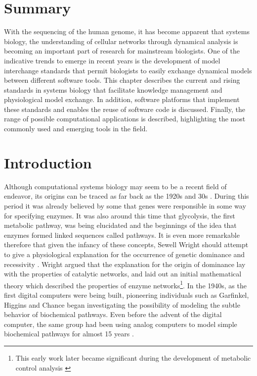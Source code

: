 \section{Summary}

With the sequencing of the human genome, it has become apparent that
systems biology, the understanding of cellular networks through
dynamical analysis is becoming an important part of research for
mainstream biologists. One of the indicative trends to emerge in recent
years is the development of model interchange standards that permit
biologists to easily exchange dynamical models between different
software tools. This chapter describes the current and rising standards
in systems biology that facilitate knowledge management and
physiological model exchange. In addition, software platforms that
implement these standards and enables the reuse of software code is
discussed. Finally, the range of possible computational applications is
described, highlighting the most commonly used and emerging tools in the
field.

\section{Introduction}

Although computational systems biology may seem to be a recent field of
endeavor, its origins can be traced as far back as the 1920s and 30s
\autocite{Wright1929}. During this period it was already believed by
some that genes were responsible in some way for specifying enzymes. It
was also around this time that glycolysis, the first metabolic pathway,
was being elucidated and the beginnings of the idea that enzymes formed
linked sequences called pathways. It is even more remarkable therefore
that given the infancy of these concepts, Sewell Wright should attempt
to give a physiological explanation for the occurrence of genetic
dominance and recessivity \autocite{Wright1934}. Wright argued that the
explanation for the origin of dominance lay with the properties of
catalytic networks, and laid out an initial mathematical theory which
described the properties of enzyme networks\footnote{This early work
  later became significant during the development of metabolic control
  analysis \autocite{KB81}}. In the 1940s, as the first digital
computers were being built, pioneering individuals such as Garfinkel,
Higgins and Chance began investigating the possibility of modeling the
subtle behavior of biochemical pathways. Even before the advent of the
digital computer, the same group had been using analog computers to
model simple biochemical pathways for almost 15 years
\autocites{Ga61}{Hi59}{Chance1943}.

